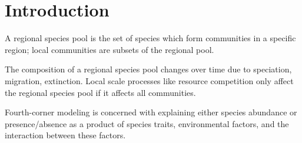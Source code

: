 \documentclass[12pt,letterpaper]{article}
\begin{document}
\section*{Introduction}


A regional species pool is the set of species which form communities in a specific region; local communities are subsets of the regional pool.

The composition of a regional species pool changes over time due to speciation, migration, extinction. Local scale processes like resource competition only affect the regional species pool if it affects all communities.

Fourth-corner modeling is concerned with explaining either species abundance or presence/absence as a product of species traits, environmental factors, and the interaction between these factors.

\end{document}
